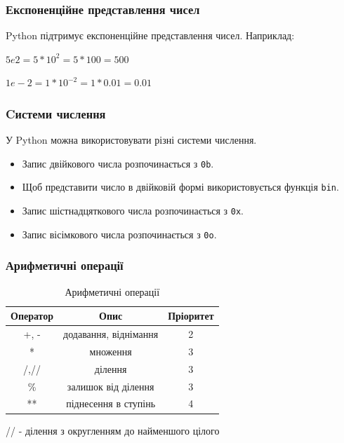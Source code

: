 \begin{frame}
\frametitle{Експоненційне представлення чисел}
Python підтримує експоненційне представлення чисел. Наприклад:

\LARGE{
$5e2 = 5\ast 10^2 = 5\ast 100 = 500$

$1e-2 = 1\ast 10^{-2} = 1\ast 0.01 = 0.01$  
}
\end{frame}

\begin{frame}
\frametitle{Cистеми числення}
У Python можна використовувати різні системи числення. 
\begin{itemize}
\item Запис двійкового числа розпочинається з \texttt{0b}.
\item Щоб представити число в двійковій формі використовується функція \texttt{bin}.
\item Запис шістнадцяткового числа розпочинається з \texttt{0x}.
\item Запис вісімкового числа розпочинається з \texttt{0o}. 
\end{itemize}
\end{frame}


 
\begin{frame}
\frametitle{Арифметичні операції}

\begin{table}
  \caption{Арифметичні операції}
  \label{tab:}

  \begin{center}
    \begin{tabular}{|c|c|c|}
      \hline
      \textbf{Оператор} & \textbf{Опис} & \textbf{Пріоритет} \\
      \hline
      +, - & додавання, віднімання & 2 \\
       \hline
      * & множення & 3 \\
       \hline
       /,// & ділення & 3 \\
       \hline
       \% & залишок від ділення & 3 \\
       \hline
       ** & піднесення в ступінь & 4 \\
       \hline
    \end{tabular}
  \end{center}
\end{table}
 \begin{center}
   \tiny{// - ділення з округленням до найменшого цілого}
  \end{center}
\end{frame}

